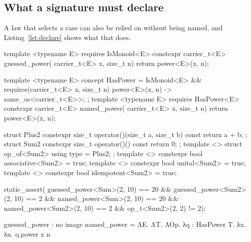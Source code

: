 \subsection{What a signature must declare}
\label{sec:examples:declare}

A law that selects a case can also be relied on without being named, and Listing~\ref{lst:declare} shows what that does.

\begin{listing}[tp]
\begin{minipage}[t]{0.48\linewidth}
\begin{cpp}
template <typename E>
  requires IsMonoid<E>
constexpr carrier_t<E> guessed_power(
    carrier_t<E> x, size_t n) {
  return power<E>(x, n); }

template <typename E>
concept HasPower = IsMonoid<E> &&
  requires(carrier_t<E> x, size_t n) {
    { power<E>(x, n) }
      -> same_as<carrier_t<E>>; };
template <typename E>
  requires HasPower<E>
constexpr carrier_t<E> named_power(
    carrier_t<E> x, size_t n) {
  return power<E>(x, n); }
\end{cpp}
\end{minipage}\hspace{0.04\linewidth}%
\begin{minipage}[t]{0.48\linewidth}
\begin{cpp}
struct Plus2 { constexpr size_t
  operator()(size_t a, size_t b) const {
    return a + b; } };
struct Sum2 { constexpr size_t
  operator()() const { return 0; } };
template <> struct op_of<Sum2> {
  using type = Plus2; };
template <> constexpr bool
associative<Sum2> = true;
template <> constexpr bool
unital<Sum2> = true;
template <> constexpr bool
idempotent<Sum2> = true;

static_assert(
guessed_power<Sum>(2, 10) == 20 &&
guessed_power<Sum2>(2, 10) == 2 &&
named_power<Sum>(2, 10) == 20 &&
named_power<Sum2>(2, 10) == 2 &&
op_t<Sum2>{}(2, 2) != 2);
\end{cpp}
\end{minipage}
\vspace{-7pt}
\begin{sysf}
guessed_power : no image
named_power = ΛE. ΛT. ΛOp. λq : HasPower T. λx. λn. q.power x n
\end{sysf}
\caption{What a signature must declare: a caller that names too little, and one that declares its dependency.
Left: the two callers. Right: a false axiom, planted, and their tests. Below: their images.}
\label{lst:declare}
\end{listing}

